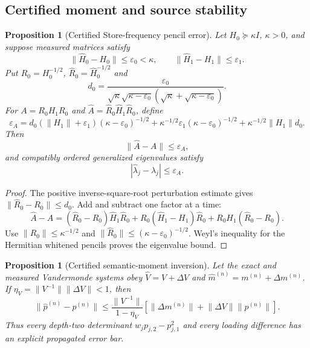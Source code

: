 \documentclass[11pt]{article}
\newtheorem{proposition}[theorem]{Proposition}
\theoremstyle{definition}
\theoremstyle{remark}
\newcommand{\norm}[1]{\lVert#1\rVert}
\begin{document}
\subsection{Certified moment and source stability}

\begin{proposition}[Certified Store-frequency pencil error]
\label{prop:store-pencil-error-master}
Let $H_0\succeq\kappa I$, $\kappa>0$, and suppose measured matrices satisfy
\[
  \norm{\widehat H_0-H_0}\le\varepsilon_0<\kappa,
  \qquad
  \norm{\widehat H_1-H_1}\le\varepsilon_1.
\]
Put $R_0=H_0^{-1/2}$, $\widehat R_0=\widehat H_0^{-1/2}$ and
\[
  d_0=
  \frac{\varepsilon_0}
  {\sqrt\kappa\sqrt{\kappa-\varepsilon_0}
   (\sqrt\kappa+\sqrt{\kappa-\varepsilon_0})}.
\]
For $A=R_0H_1R_0$ and
$\widehat A=\widehat R_0\widehat H_1\widehat R_0$, define
\[
  \varepsilon_A=
  d_0(\norm{H_1}+\varepsilon_1)(\kappa-\varepsilon_0)^{-1/2}
  +\kappa^{-1/2}\varepsilon_1(\kappa-\varepsilon_0)^{-1/2}
  +\kappa^{-1/2}\norm{H_1}d_0.
\]
Then
\begin{equation}
  \boxed{\norm{\widehat A-A}\le\varepsilon_A,}
  \label{eq:store-pencil-operator-error-master}
\end{equation}
and compatibly ordered generalized eigenvalues satisfy
\begin{equation}
  \boxed{|\widehat\lambda_j-\lambda_j|\le\varepsilon_A.}
  \label{eq:store-pencil-eigen-error-master}
\end{equation}
\end{proposition}

\begin{proof}
The positive inverse-square-root perturbation estimate gives
$\norm{\widehat R_0-R_0}\le d_0$.  Add and subtract one factor at a time:
\[
 \widehat A-A
 = (\widehat R_0-R_0)\widehat H_1\widehat R_0
 + R_0(\widehat H_1-H_1)\widehat R_0
 + R_0H_1(\widehat R_0-R_0).
\]
Use $\norm{R_0}\le\kappa^{-1/2}$ and
$\norm{\widehat R_0}\le(\kappa-\varepsilon_0)^{-1/2}$.  Weyl's inequality for
the Hermitian whitened pencils proves the eigenvalue bound.
\end{proof}

\begin{proposition}[Certified semantic-moment inversion]
\label{prop:semantic-moment-error-master}
Let the exact and measured Vandermonde systems obey
$\widehat V=V+\Delta V$ and
$\widehat m^{(n)}=m^{(n)}+\Delta m^{(n)}$.  If
$\eta_V=\norm{V^{-1}}\norm{\Delta V}<1$, then
\begin{equation}
  \boxed{
  \norm{\widehat p^{(n)}-p^{(n)}}
  \le
  \frac{\norm{V^{-1}}}{1-\eta_V}
  \left[
    \norm{\Delta m^{(n)}}
    +\norm{\Delta V}\norm{p^{(n)}}
  \right].}
  \label{eq:semantic-moment-error-master}
\end{equation}
Thus every depth-two determinant
$w_jp_{j,2}-p_{j,1}^2$ and every loading difference has an explicit propagated
error bar.
\end{proposition}
\end{document}
